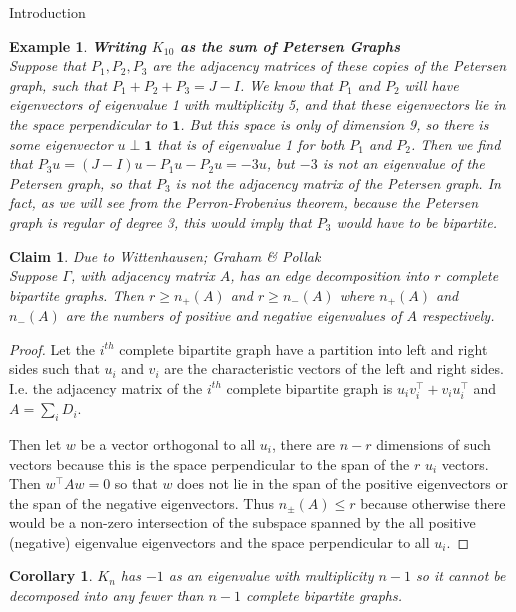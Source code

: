 \documentclass{article}
\newtheorem{claim}{Claim}
\newtheorem{cor}{Corollary}
\newtheorem{example}{Example}
\begin{document}
\begin{section}{Introduction}
\begin{example}{\textbf{Writing $K_{10}$ as the sum of Petersen Graphs}\\}
    Suppose that $P_1,P_2,P_3$ are the adjacency matrices of these copies of the Petersen graph, such that $P_1 + P_2 + P_3 = J - I$.
    We know that $P_1$ and $P_2$ will have eigenvectors of eigenvalue 1 with multiplicity 5, and that these eigenvectors lie in the space perpendicular to $\mathbf 1$.
    But this space is only of dimension 9, so there is some eigenvector $u \perp \mathbf 1$ that is of eigenvalue 1 for both $P_1$ and $P_2$.
    Then we find that $P_3u = (J-I)u - P_1u - P_2u = -3u$, but $-3$ is not an eigenvalue of the Petersen graph, so that $P_3$ is not the adjacency matrix of the Petersen graph.
    In fact, as we will see from the Perron-Frobenius theorem, because the Petersen graph is regular of degree 3, this would imply that $P_3$ would have to be bipartite.
  \end{example}
  \begin{claim}{Due to Wittenhausen; Graham \& Pollak\\}
    Suppose $\Gamma$, with adjacency matrix $A$, has an edge decomposition into $r$ complete bipartite graphs.
    Then $r \geq n_+(A)$ and $r \geq n_-(A)$ where $n_+(A)$ and $n_-(A)$ are the numbers of positive and negative eigenvalues of $A$ respectively.
  \end{claim}
  \begin{proof}
    Let the $i^{th}$ complete bipartite graph have a partition into left and right sides such that $u_i$ and $v_i$ are the characteristic vectors of the left and right sides.
    I.e. the adjacency matrix of the $i^{th}$ complete bipartite graph is $u_iv_i^\intercal + v_iu_i^\intercal$ and $A = \sum_iD_i$.

    Then let $w$ be a vector orthogonal to all $u_i$, there are $n-r$ dimensions of such vectors because this is the space perpendicular to the span of the $r$ $u_i$ vectors.
    Then $w^\intercal A w = 0$ so that $w$ does not lie in the span of the positive eigenvectors or the span of the negative eigenvectors.
    Thus $n_\pm(A) \leq r$ because otherwise there would be a non-zero intersection of the subspace spanned by the all positive (negative) eigenvalue eigenvectors and the space perpendicular to all $u_i$.
  \end{proof}

  \begin{cor}
    $K_n$ has $-1$ as an eigenvalue with multiplicity $n-1$ so it cannot be decomposed into any fewer than $n-1$ complete bipartite graphs.
  \end{cor}


\end{section}
\end{document}

